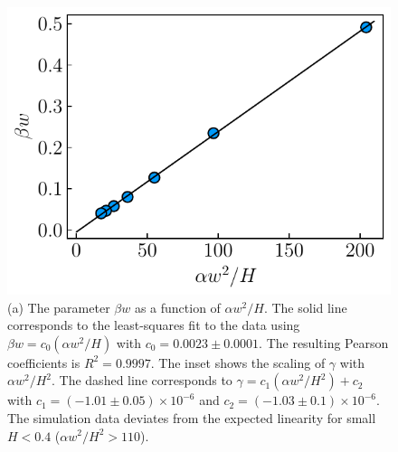 \documentclass[aps,pre,
superscriptaddress,
twocolumn,
notitlepage,
10pt,]{revtex4-1}
\begin{document}
\begin{figure}[!h] %
	\centering %
		\includegraphics[width=0.99\columnwidth]{fig5.pdf}
	\caption{(a) The parameter $\beta w$ as a function of $ \alpha w^2/H$.
		The solid line corresponds to the least-squares fit to the data using
		$\beta w = c_0 \left(\alpha w^2/H\right) $ with $ c_0=0.0023 \pm 0.0001$.
		The resulting Pearson coefficients is $ R^2 = 0.9997 $. The inset shows the scaling of
		$\gamma$ with $\alpha w^2/H^2$. The dashed line corresponds to $ \gamma = c_1
		\left(\alpha w^2/H^2\right) + c_2$ with $c_1 = (-1.01\pm0.05)\times10^{-6}$
		and $c_2 = (-1.03\pm0.1)\times10^{-6}$. The simulation data deviates from the
		expected linearity for small $H<0.4$ ($\alpha w^2/H^2 > 110$).}
	\label{fig5} %
\end{figure}
\end{document}
